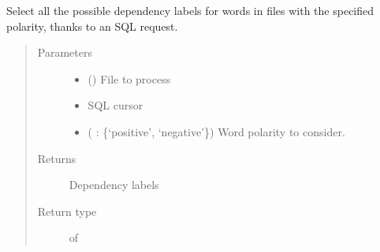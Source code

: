 \documentclass[letterpaper,10pt,english]{sphinxmanual}
\begin{document}

\begin{fulllineitems}
\label{\detokenize{analysis:loacore.analysis.frequencies.get_polarity_label_set}}
Select all the possible dependency labels for words in files with the specified polarity, thanks to an SQL request.
\begin{quote}\begin{description}
\item[{Parameters}] \leavevmode\begin{itemize}
\item {} 
 ({\hyperref[\detokenize{classes:loacore.classes.classes.File}]{}}) \textendash{} File to process

\item {} 
 \textendash{} SQL cursor

\item {} 
 ( : \{‘positive’, ‘negative’\}) \textendash{} Word polarity to consider.

\end{itemize}

\item[{Returns}] \leavevmode
Dependency labels

\item[{Return type}] \leavevmode
{} of 

\end{description}\end{quote}

\end{fulllineitems}

\end{document}
